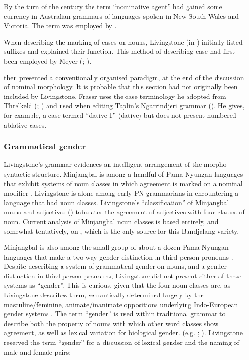 By the turn of the century the term “nominative agent” had gained some currency in Australian grammars of languages spoken in New South Wales and Victoria. The term was employed by \citet{mathews_languages_1903}.

When describing the marking of cases on nouns, Livingstone (in \citealt[9--11]{livingstone_grammar_1892}) initially listed suffixes and explained their function. This method of describing case had first been employed by Meyer (\citeyear{meyer_vocabulary_1843}; ).

\citet[Part IV, 14]{fraser_australian_1892} then presented a conventionally organised paradigm, at the end of the discussion of nominal morphology. It is probable that this section had not originally been included by Livingstone. Fraser uses the case terminology he adopted from Threlkeld (\citeyear{threlkeld_australian_1834}; ) and used when editing Taplin’s Ngarrindjeri grammar (). He gives, for example, a case termed “dative 1” (dative) but does not present numbered ablative cases.

\subsubsection{Grammatical gender}
\label{sec:key:4.6.1.1}
\label{sec:4.6.1.1}

Livingstone’s grammar evidences an intelligent arrangement of the morpho-syn\-tac\-tic structure. Minjangbal is among a handful of Pama-Nyungan languages that exhibit systems of noun classes in which agreement is marked on a nominal modifier \citep[450--453]{dixon_australian_2002}. Livingstone is alone among early PN grammarians in encountering a language that had noun classes. Livingstone’s “classification” of Minjangbal nouns and adjectives (\citeyear[4--5]{livingstone_grammar_1892}) tabulates the agreement of adjectives with four classes of noun. Current analysis of Minjangbal noun classes \citep[43--45]{crowley_middle_1978} is based entirely, and somewhat tentatively, on \citet{livingstone_grammar_1892}, which is the only source for this Bandjalang variety.

Minjangbal is also among the small group of about a dozen Pama-Nyungan languages that make a two-way gender distinction in third-person pronouns \citep[461]{dixon_australian_2002}. Despite describing a system of grammatical gender on nouns, and a gender distinction in third-person pronouns, Livingstone did not present either of these systems as ``gender''. This is curious, given that the four noun classes are, as Livingstone describes them, semantically determined largely by the masculine/feminine, animate/inanimate oppositions underlying Indo-European gender systems \citep[61]{kurzova_1993}. The term “gender” is used within traditional grammar to describe both the property of nouns with which other word classes show agreement, as well as lexical variation for biological gender. (e.g. \citealt[10--11]{gildersleeve_latin_1895}; \citealt[19--32]{ramshorn_lateinische_1824}). Livingstone reserved the term “gender” for a discussion of lexical gender and the naming of male and female pairs: 

